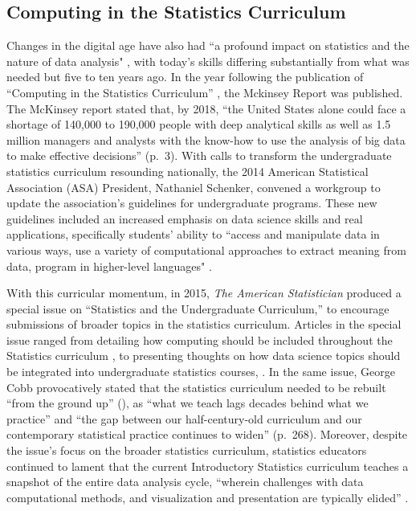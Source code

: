 \documentclass[12pt]{article}
\begin{document}
\subsection{Computing in the Statistics Curriculum}

\quad Changes in the digital age have also had ``a profound impact on statistics
and the nature of data analysis" \citep[p.\ 97]{nolan}, with today's skills 
differing substantially from what was needed but five to ten years ago. 
In the year following the publication of ``Computing in the Statistics 
Curriculum'' \citep{nolan}, the Mckinsey Report \citep{mckinsey} was published. 
The McKinsey report stated that, by 2018, ``the United States alone could face a
shortage of 140,000 to 190,000 people with deep analytical skills as well as 1.5
million managers and analysts with the know-how to use the analysis of big data
to make effective decisions'' (p.\ 3). With calls to transform the undergraduate
statistics curriculum resounding nationally, the 2014 American Statistical 
Association (ASA) President, Nathaniel Schenker, convened a workgroup to update
the association's guidelines for undergraduate programs. These new guidelines 
included an increased emphasis on data science skills and real applications, 
specifically students' ability to ``access and manipulate data in various ways,
use a variety of computational approaches to extract meaning from data, program
in higher-level languages" \citep[p.\ 7]{asa}. 

\quad With this curricular momentum, in 2015, \emph{The American Statistician} 
produced a special issue on ``Statistics and the Undergraduate Curriculum,'' to
encourage submissions of broader topics in the statistics curriculum. Articles 
in the special issue ranged from detailing how computing should be included 
throughout the Statistics curriculum \citep{jenny, tintle, hesterberg}, to 
presenting thoughts on how data science topics should be integrated into 
undergraduate statistics courses, \citep{esr, grimshaw, 
baumer_datascience, hardin}. In the same issue, George Cobb provocatively stated
that the statistics curriculum needed to be rebuilt ``from the ground up'' 
(\citeyear{cobb}), as ``what we teach lags decades behind what we practice'' and
``the gap between our half-century-old curriculum and our contemporary 
statistical practice continues to widen'' (p.\ 268). Moreover, despite the 
issue's focus on the broader statistics curriculum, statistics educators
continued to lament that the current Introductory Statistics curriculum teaches
a snapshot of the entire data analysis cycle, ``wherein challenges with data
computational methods, and visualization and presentation are typically elided'' 
\citep[p.\ 336]{baumer_datascience}. 
\end{document}
